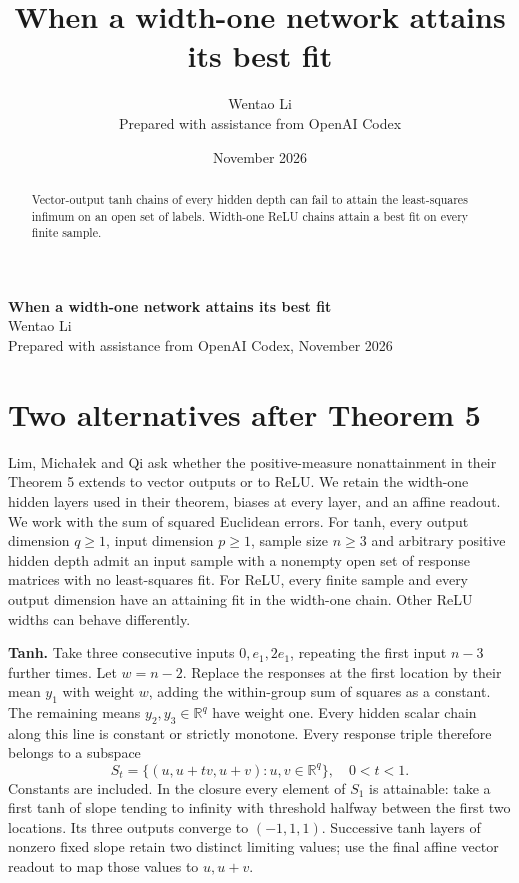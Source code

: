 \documentclass[10pt]{article}
\title{When a width-one network attains its best fit}
\author{Wentao Li\\{\small Prepared with assistance from OpenAI Codex}}
\date{November 2026}
\begin{document}
\begin{center}{\Large\bfseries When a width-one network attains its best fit}\\[3pt]Wentao Li\\{\small Prepared with assistance from OpenAI Codex, November 2026}\end{center}
\begin{abstract}
Vector-output tanh chains of every hidden depth can fail to attain the least-squares infimum on an open set of labels. Width-one ReLU chains attain a best fit on every finite sample.
\end{abstract}
\section*{Two alternatives after Theorem 5}
Lim, Micha\l ek and Qi ask whether the positive-measure nonattainment in their Theorem 5 extends to vector outputs or to ReLU. We retain the width-one hidden layers used in their theorem, biases at every layer, and an affine readout. We work with the sum of squared Euclidean errors. For tanh, every output dimension $q\ge1$, input dimension $p\ge1$, sample size $n\ge3$ and arbitrary positive hidden depth admit an input sample with a nonempty open set of response matrices with no least-squares fit. For ReLU, every finite sample and every output dimension have an attaining fit in the width-one chain. Other ReLU widths can behave differently.

\textbf{Tanh.} Take three consecutive inputs $0,e_1,2e_1$, repeating the first input $n-3$ further times. Let $w=n-2$. Replace the responses at the first location by their mean $y_1$ with weight $w$, adding the within-group sum of squares as a constant. The remaining means $y_2,y_3\in\mathbb R^q$ have weight one. Every hidden scalar chain along this line is constant or strictly monotone. Every response triple therefore belongs to a subspace
\[
  S_t=\{(u,u+t v,u+v):u,v\in\mathbb R^q\},\quad 0<t<1 .
\]
Constants are included. In the closure every element of $S_1$ is attainable: take a first tanh of slope tending to infinity with threshold halfway between the first two locations. Its three outputs converge to $(-1,1,1)$. Successive tanh layers of nonzero fixed slope retain two distinct limiting values; use the final affine vector readout to map those values to $u,u+v$.
\end{document}
